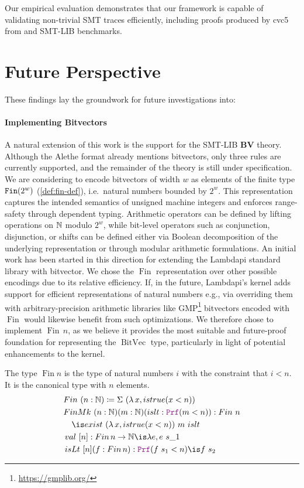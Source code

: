\bigskip

Our empirical evaluation demonstrates that our framework is capable of validating non-trivial SMT traces efficiently, including proofs produced by cvc5 from \tlaps and SMT-LIB benchmarks.

\section{Future Perspective}

These findings lay the groundwork for future investigations into:


\paragraph{Implementing Bitvectors}
A natural extension of this work is the support for the SMT-LIB \textbf{BV} theory.
Although the Alethe format already mentions bitvectors, only three rules are currently supported, and the remainder of the theory is still under specification. 
We are considering to encode bitvectors of width $w$ as elements of the finite type $\texttt{\upshape{Fin}}(2^w)$ (\cref{def:fin-def}), i.e.\ natural numbers bounded by $2^w$.
This representation captures the intended semantics of unsigned machine integers and enforces range-safety through dependent typing. 
Arithmetic operators can be defined by lifting operations on $\mathbb{N}$ modulo $2^w$, while bit-level operators such as conjunction, disjunction, or shifts can be defined either via Boolean decomposition of the underlying representation or through modular arithmetic formulations.  
An initial work has been started in this direction for extending the Lambdapi standard library with bitvector.
We chose the $\mathop{Fin}$ representation over other possible encodings due to its relative efficiency.
If, in the future, Lambdapi's kernel adds support for efficient representations of natural numbers e.g.,
via overriding them with arbitrary-precision arithmetic libraries like GMP\footnote{\url{https://gmplib.org/}} bitvectors encoded with $\mathop{Fin}$ would likewise benefit from such optimizations.
We therefore chose to implement $\mathop{Fin}\,n$, as we believe it provides the most suitable and future-proof foundation for representing the $\mathop{BitVec}$ type,
particularly in light of potential enhancements to the kernel.

\begin{definition}[Fin]\label{def:fin-def}
The type $\mathop{Fin} n$ is the type of natural numbers $i$ with the constraint that $i < n$.
It is the canonical type with $n$ elements.
\begin{align*}
& Fin~(n: \N) \coloneq \Sigma~(\lambda\,x, istrue(x < n)) \\
& FinMk~(n: \N) (m: \N) (islt: \prf (m < n)) : Fin~n \\
&\quad\is exist~(\lambda\,x, istrue(x <n))~m~islt\\
&\mathop{val}~[n]: \mathop{Fin} n \ra \N \is \lambda e, e~s\_1 \\
&\mathop{isLt}~[n] (f: \mathop{Fin} n): \prf (f~s_1 < n) \is f~s_2\\
\end{align*}
\end{definition}


